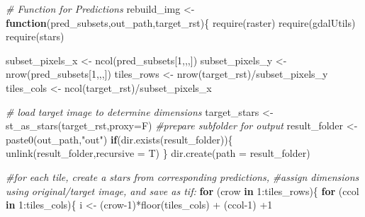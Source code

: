 \documentclass[
]{article}
\newenvironment{Shaded}{\begin{snugshade}}{\end{snugshade}}
\newcommand{\AttributeTok}[1]{\textcolor[rgb]{0.77,0.63,0.00}{#1}}
\newcommand{\CommentTok}[1]{\textcolor[rgb]{0.56,0.35,0.01}{\textit{#1}}}
\newcommand{\ControlFlowTok}[1]{\textcolor[rgb]{0.13,0.29,0.53}{\textbf{#1}}}
\newcommand{\DecValTok}[1]{\textcolor[rgb]{0.00,0.00,0.81}{#1}}
\newcommand{\FunctionTok}[1]{\textcolor[rgb]{0.00,0.00,0.00}{#1}}
\newcommand{\NormalTok}[1]{#1}
\newcommand{\OtherTok}[1]{\textcolor[rgb]{0.56,0.35,0.01}{#1}}
\newcommand{\SpecialCharTok}[1]{\textcolor[rgb]{0.00,0.00,0.00}{#1}}
\newcommand{\StringTok}[1]{\textcolor[rgb]{0.31,0.60,0.02}{#1}}
\begin{document}
\begin{Shaded}
\begin{Highlighting}[]
\CommentTok{\# Function for Predictions}
\NormalTok{rebuild\_img }\OtherTok{\textless{}{-}} \ControlFlowTok{function}\NormalTok{(pred\_subsets,out\_path,target\_rst)\{}
  \FunctionTok{require}\NormalTok{(raster)}
  \FunctionTok{require}\NormalTok{(gdalUtils)}
  \FunctionTok{require}\NormalTok{(stars)}


\NormalTok{  subset\_pixels\_x }\OtherTok{\textless{}{-}} \FunctionTok{ncol}\NormalTok{(pred\_subsets[}\DecValTok{1}\NormalTok{,,,])}
\NormalTok{  subset\_pixels\_y }\OtherTok{\textless{}{-}} \FunctionTok{nrow}\NormalTok{(pred\_subsets[}\DecValTok{1}\NormalTok{,,,])}
\NormalTok{  tiles\_rows }\OtherTok{\textless{}{-}} \FunctionTok{nrow}\NormalTok{(target\_rst)}\SpecialCharTok{/}\NormalTok{subset\_pixels\_y}
\NormalTok{  tiles\_cols }\OtherTok{\textless{}{-}} \FunctionTok{ncol}\NormalTok{(target\_rst)}\SpecialCharTok{/}\NormalTok{subset\_pixels\_x}

  \CommentTok{\# load target image to determine dimensions}
\NormalTok{   target\_stars }\OtherTok{\textless{}{-}} \FunctionTok{st\_as\_stars}\NormalTok{(target\_rst,}\AttributeTok{proxy=}\NormalTok{F)}
   \CommentTok{\#prepare subfolder for output}
\NormalTok{   result\_folder }\OtherTok{\textless{}{-}} \FunctionTok{paste0}\NormalTok{(out\_path,}\StringTok{"out"}\NormalTok{)}
   \ControlFlowTok{if}\NormalTok{(}\FunctionTok{dir.exists}\NormalTok{(result\_folder))\{}
     \FunctionTok{unlink}\NormalTok{(result\_folder,}\AttributeTok{recursive =}\NormalTok{ T)}
\NormalTok{   \}}
   \FunctionTok{dir.create}\NormalTok{(}\AttributeTok{path =}\NormalTok{ result\_folder)}

  \CommentTok{\#for each tile, create a stars from corresponding predictions,}
  \CommentTok{\#assign dimensions using original/target image, and save as tif:}
  \ControlFlowTok{for}\NormalTok{ (crow }\ControlFlowTok{in} \DecValTok{1}\SpecialCharTok{:}\NormalTok{tiles\_rows)\{}
    \ControlFlowTok{for}\NormalTok{ (ccol }\ControlFlowTok{in} \DecValTok{1}\SpecialCharTok{:}\NormalTok{tiles\_cols)\{}
\NormalTok{      i }\OtherTok{\textless{}{-}}\NormalTok{ (crow}\DecValTok{{-}1}\NormalTok{)}\SpecialCharTok{*}\FunctionTok{floor}\NormalTok{(tiles\_cols) }\SpecialCharTok{+}\NormalTok{ (ccol}\DecValTok{{-}1}\NormalTok{) }\SpecialCharTok{+}\DecValTok{1}


\end{Highlighting}
\end{Shaded}
\end{document}
